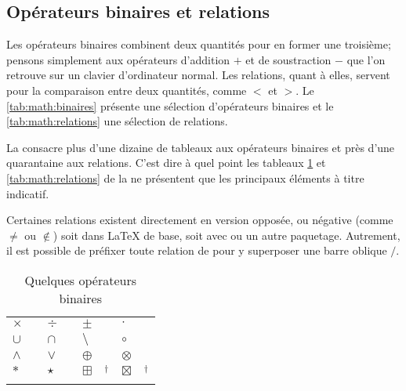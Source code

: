 \subsection{Opérateurs binaires et relations}
\label{sec:math:symboles:binaires+relations}

Les opérateurs binaires combinent deux quantités pour en former une
troisième; pensons simplement aux opérateurs d'addition $+$ et de
soustraction $-$ que l'on retrouve sur un clavier d'ordinateur normal.
Les relations, quant à elles, servent pour la comparaison entre deux
quantités, comme $<$ et $>$. Le \autoref{tab:math:binaires}
présente une sélection d'opérateurs binaires et
le \autoref{tab:math:relations}  une sélection de relations.

La %
consacre plus d'une dizaine de tableaux aux opérateurs binaires et
près d'une quarantaine aux relations. C'est dire à quel point les
tableaux \ref*{tab:math:binaires} et \ref*{tab:math:relations} de la
 ne présentent que les principaux
éléments à titre indicatif.

Certaines relations existent directement en version opposée, ou
négative (comme $\neq$ ou $\notin$) soit dans {\LaTeX} de base, soit
avec  ou un autre paquetage. Autrement, il est possible
de préfixer toute relation de \cmd{\not} pour y superposer une barre
oblique $/$.

\begin{table}[p]
  \caption{Quelques opérateurs binaires}
  \label{tab:math:binaires}
  \begin{tabularx}{1.0\linewidth}{lXlXlXlX}
    $\times$    & \cmd{\times} &
    $\div$      & \cmd{\div}   &
    $\pm$       & \cmd{\pm}    &
    $\cdot$     & \cmd{\cdot}    \\
    $\cup$      & \cmd{\cup} &
    $\cap$      & \cmd{\cap} &
    $\setminus$ & \cmd{\setminus} &
    $\circ$     & \cmd{\circ}  \\
    $\wedge$    & \cmd{\wedge} &
    $\vee$      & \cmd{\vee} &
    $\oplus$    & \cmd{\oplus} &
    $\otimes$   & \cmd{\otimes} \\
    $\ast$      & \cmd{\ast} &
    $\star$     & \cmd{\star} &
    $\boxplus$  & \cmd{\boxplus}$^\dagger$ &
    $\boxtimes$ & \cmd{\boxtimes}$^\dagger$ \\
    \addlinespace
  \end{tabularx}
\end{table}

